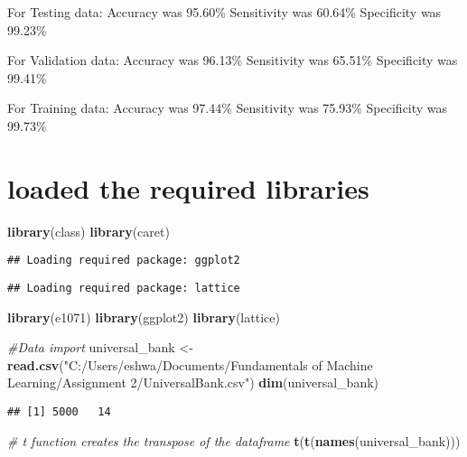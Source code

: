 \documentclass[
]{article}
\newenvironment{Shaded}{\begin{snugshade}}{\end{snugshade}}
\newcommand{\CommentTok}[1]{\textcolor[rgb]{0.56,0.35,0.01}{\textit{#1}}}
\newcommand{\FunctionTok}[1]{\textcolor[rgb]{0.13,0.29,0.53}{\textbf{#1}}}
\newcommand{\NormalTok}[1]{#1}
\newcommand{\OtherTok}[1]{\textcolor[rgb]{0.56,0.35,0.01}{#1}}
\newcommand{\StringTok}[1]{\textcolor[rgb]{0.31,0.60,0.02}{#1}}
\begin{document}
For Testing data: Accuracy was 95.60\% Sensitivity was 60.64\%
Specificity was 99.23\%

For Validation data: Accuracy was 96.13\% Sensitivity was 65.51\%
Specificity was 99.41\%

For Training data: Accuracy was 97.44\% Sensitivity was 75.93\%
Specificity was 99.73\%

\hypertarget{loaded-the-required-libraries}{%
\section{loaded the required
libraries}\label{loaded-the-required-libraries}}

\begin{Shaded}
\begin{Highlighting}[]
\FunctionTok{library}\NormalTok{(class)}
\FunctionTok{library}\NormalTok{(caret)}
\end{Highlighting}
\end{Shaded}

\begin{verbatim}
## Loading required package: ggplot2
\end{verbatim}

\begin{verbatim}
## Loading required package: lattice
\end{verbatim}

\begin{Shaded}
\begin{Highlighting}[]
\FunctionTok{library}\NormalTok{(e1071)}
\FunctionTok{library}\NormalTok{(ggplot2)}
\FunctionTok{library}\NormalTok{(lattice)}
\end{Highlighting}
\end{Shaded}

\begin{Shaded}
\begin{Highlighting}[]
\CommentTok{\#Data import }
\NormalTok{universal\_bank }\OtherTok{\textless{}{-}} \FunctionTok{read.csv}\NormalTok{(}\StringTok{"C:/Users/eshwa/Documents/Fundamentals of Machine Learning/Assignment 2/UniversalBank.csv"}\NormalTok{)}
\FunctionTok{dim}\NormalTok{(universal\_bank)}
\end{Highlighting}
\end{Shaded}

\begin{verbatim}
## [1] 5000   14
\end{verbatim}

\begin{Shaded}
\begin{Highlighting}[]
\CommentTok{\# t function creates the transpose of the dataframe}
\FunctionTok{t}\NormalTok{(}\FunctionTok{t}\NormalTok{(}\FunctionTok{names}\NormalTok{(universal\_bank)))}
\end{Highlighting}
\end{Shaded}
\end{document}
